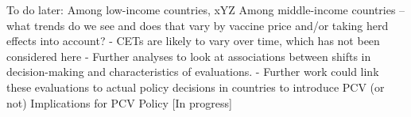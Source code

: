 \documentclass[12pt]{article}
\begin{document}
To do later:
Among low-income countries, xYZ 
Among middle-income countries – what trends do we see and does that vary by vaccine price and/or taking herd effects into account?
-	CETs are likely to vary over time, which has not been considered here
-	Further analyses to look at associations between shifts in decision-making and characteristics of evaluations.
-	Further work could link these evaluations to actual policy decisions in countries to introduce PCV (or not)
Implications for PCV Policy
[In progress]





\clearpage
\newrefcontext[sorting=nyt]
\printbibliography
\end{document}
